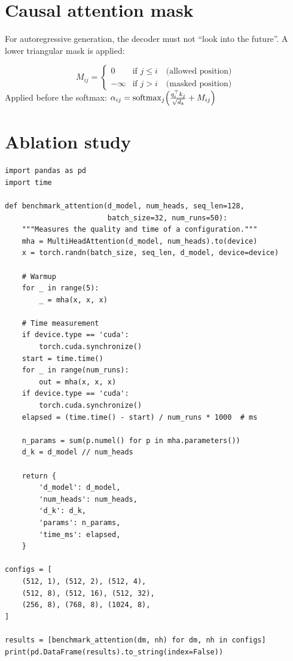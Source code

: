 \section{Causal attention mask}
\label{sec:causal-mask}

For autoregressive generation, the decoder must not ``look into the
future''. A lower triangular mask is applied:

\begin{keyformulas}[title=\textbf{Causal mask}]
\begin{equation}
M_{ij} = \begin{cases}
0 & \text{if } j \leq i \quad \text{(allowed position)} \\
-\infty & \text{if } j > i \quad \text{(masked position)}
\end{cases}
\end{equation}
Applied before the softmax:
$\alpha_{ij} = \mathrm{softmax}_j\!\left(\frac{q_i^\top k_j}{\sqrt{d_k}} + M_{ij}\right)$
\end{keyformulas}

\section{Ablation study}
\label{sec:attention-ablation}

\begin{codeblock}[title=\textbf{Ablation: number of heads and dimension per head}]
\begin{verbatim}
import pandas as pd
import time

def benchmark_attention(d_model, num_heads, seq_len=128,
                        batch_size=32, num_runs=50):
    """Measures the quality and time of a configuration."""
    mha = MultiHeadAttention(d_model, num_heads).to(device)
    x = torch.randn(batch_size, seq_len, d_model, device=device)

    # Warmup
    for _ in range(5):
        _ = mha(x, x, x)

    # Time measurement
    if device.type == 'cuda':
        torch.cuda.synchronize()
    start = time.time()
    for _ in range(num_runs):
        out = mha(x, x, x)
    if device.type == 'cuda':
        torch.cuda.synchronize()
    elapsed = (time.time() - start) / num_runs * 1000  # ms

    n_params = sum(p.numel() for p in mha.parameters())
    d_k = d_model // num_heads

    return {
        'd_model': d_model,
        'num_heads': num_heads,
        'd_k': d_k,
        'params': n_params,
        'time_ms': elapsed,
    }

configs = [
    (512, 1), (512, 2), (512, 4),
    (512, 8), (512, 16), (512, 32),
    (256, 8), (768, 8), (1024, 8),
]

results = [benchmark_attention(dm, nh) for dm, nh in configs]
print(pd.DataFrame(results).to_string(index=False))
\end{verbatim}
\end{codeblock}

